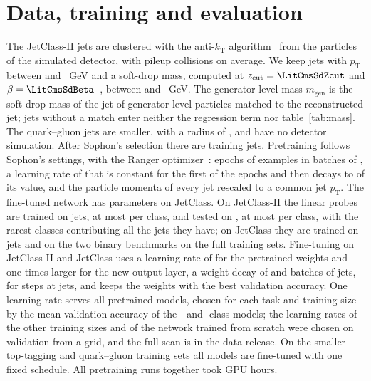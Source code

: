 {\let\FloatBarrier\relax \section{Data, training and evaluation}\label{app:training}}
The JetClass-II jets are clustered with the anti-$k_{\mathrm T}$ algorithm~\cite{antikt,fastjet} from the particles of the
simulated detector, with \LitJetClassTwoPileupMean{} pileup collisions on average.
We keep jets with $p_{\mathrm T}$ between \DesignPtMin{} and \DesignPtMax~GeV and a soft-drop mass, computed at
$z_{\mathrm{cut}} = \LitCmsSdZcut$ and $\beta = \LitCmsSdBeta$~\cite{softdrop,mmdt,cmsmlid}, between \DesignMsdMin{} and \DesignMsdMax~GeV.
The generator-level mass $m_{\mathrm{gen}}$ is the soft-drop mass of the jet of generator-level particles matched
to the reconstructed jet; jets without a match enter neither the regression term nor table~\ref{tab:mass}.
The quark--gluon jets are smaller, with a radius of \LitQgJetRadius, and have no detector simulation.
After Sophon's selection there are \DesignNTrainSelected{} training jets.
Pretraining follows Sophon's settings, with the Ranger optimizer~\cite{radam,lookahead}: \DesignEpochs{} epochs of \DesignSamplesPerEpoch{} examples in batches of
\DesignBatchSize, a learning rate of \DesignStartLr{} that is constant for the first \DesignLrFlatPercent{} of
the epochs and then decays to \DesignLrEndPercent{} of its value, and the particle momenta of every jet rescaled
to a common jet $p_{\mathrm T}$.
The fine-tuned network has \MlstNParamsJc{} parameters on JetClass.
On JetClass-II the linear probes are trained on \VProbeNTrain{} jets, at most \VProbePerClassMax{} per class, and
tested on \JcBalNTest, at most \JcBalTestPerClass{} per class, with the \JcBalNShort{} rarest classes contributing
all the jets they have; on JetClass they are trained on \LpNTrainMaxJci{} jets and on the two binary benchmarks
on the full training sets.
Fine-tuning on JetClass-II and JetClass uses a learning rate of \MlstFtLr{} for the pretrained weights and one
\MlstFtHeadMult{} times larger for the new output layer, a weight decay of \MlstFtWeightDecay{} and batches of
\MlstFtBatch{} jets, for \FtStepsESix{} steps at \FtSizeESix{} jets, and keeps the weights with the best
validation accuracy.
One learning rate serves all pretrained models, chosen for each task and training size by the mean validation accuracy
of the \Kfull- and \Kcoarse-class models; the learning rates of the other training sizes and of the network trained
from scratch were chosen on validation from a grid, and the full scan is in the data release.
On the smaller top-tagging and quark--gluon training sets all models are fine-tuned with one fixed schedule.
All pretraining runs together took \MlstComputeTotalGpuHours{} GPU hours.

